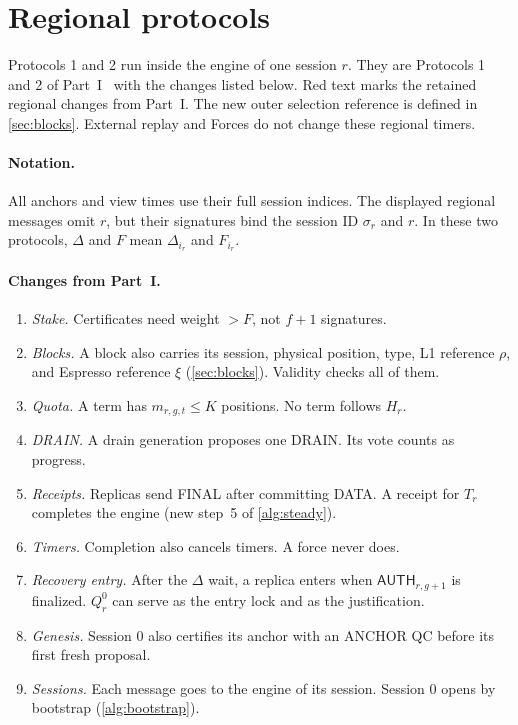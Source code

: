 \documentclass[11pt,a4paper]{article}
\newcommand{\RR}[1]{{\color{rrRed}#1}}
\newcommand{\tagg}[1]{\ensuremath{\mathsf{#1}}}
\newcounter{protocol}
\begin{document}
\section{Regional protocols}
\label{sec:protocols}
Protocols 1 and 2 run inside the engine of one session $r$. They are
Protocols 1 and 2 of Part~I~\cite{part1} with the changes listed below.
\RR{Red text} marks the retained regional changes from Part~I.
The new outer selection reference is defined in \cref{sec:blocks}.
External replay and Forces do not change these regional timers.

\paragraph{Notation.}
All anchors and view times use their full session indices. The displayed
regional messages omit $r$, but their signatures bind the session ID
$\sigma_r$ and $r$. In these two protocols, $\Delta$ and $F$ mean
$\Delta_{i_r}$ and $F_{i_r}$.

\paragraph{Changes from Part~I.}
\begin{enumerate}[label=\arabic*.]
\item \emph{Stake.} Certificates need weight $>F$, not $f+1$ signatures.
\item \emph{Blocks.} A block also carries its session, physical
position, type, L1 reference $\rho$, and Espresso reference $\xi$
(\cref{sec:blocks}). Validity
checks all of them.
\item \emph{Quota.} A term has $m_{r,g,t}\le K$ positions. No term follows
$H_r$.
\item \emph{DRAIN.} A drain generation proposes one DRAIN. Its vote
counts as progress.
\item \emph{Receipts.} Replicas send FINAL after committing DATA. A
receipt for $T_r$ completes the engine (new step~5 of \cref{alg:steady}).
\item \emph{Timers.} Completion also cancels timers. A force never does.
\item \emph{Recovery entry.} After the $\Delta$ wait, a replica enters
when $\tagg{AUTH}_{r,g+1}$ is finalized. $Q_r^0$ can serve as the entry
lock and as the justification.
\item \emph{Genesis.} Session $0$ also certifies its anchor with an
ANCHOR QC before its first fresh proposal.
\item \emph{Sessions.} Each message goes to the engine of its session.
Session $0$ opens by bootstrap (\cref{alg:bootstrap}).
\end{enumerate}
\end{document}
